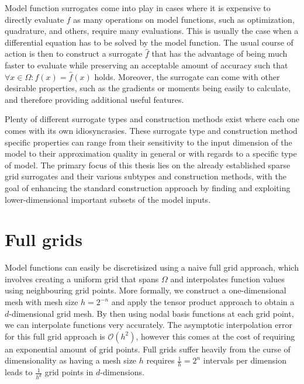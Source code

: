 \documentclass[
  a4paper,  %
  twoside,  %
  bibliography=totoc,
  headsepline,
  cleardoublepage=empty,
  parskip=half,
  draft=false
]{scrbook}
\begin{document}
Model function surrogates come into play in cases where it is expensive to directly evaluate $f$ as many operations on model functions, such as optimization, quadrature, and others, require many evaluations.
This is usually the case when a differential equation has to be solved by the model function.
The usual course of action is then to construct a surrogate $\hat{f}$ that has the advantage of being much faster to evaluate while preserving an acceptable amount of accuracy such that $\forall x \in \Omega \colon f(x)=\hat{f}(x)$ holds.
Moreover, the surrogate can come with other desirable properties, such as the gradients or moments being easily to calculate, and therefore providing additional useful features.

Plenty of different surrogate types and construction methods exist where each one comes with its own idiosyncrasies.
These surrogate type and construction method specific properties can range from their sensitivity to the input dimension of the model to their approximation quality in general or with regards to a specific type of model. 
The primary focus of this thesis lies on the already established sparse grid surrogates \cite{} and their various subtypes and construction methods, with the goal of enhancing the standard construction approach by finding and exploiting lower-dimensional important subsets of the model inputs.

\section{Full grids}

Model functions can easily be discretisized using a naive full grid approach, which involves creating a uniform grid that spans $\Omega$ and interpolates function values using neighbouring grid points.
More formally, we construct a one-dimensional mesh with mesh size $h=2^{-n}$ and apply the tensor product approach to obtain a $d$-dimensional grid mesh.
By then using nodal basis functions at each grid point, we can interpolate functions very accurately.
The asymptotic interpolation error for this full grid approach is $\mathcal{O}(h^2)$, however this comes at the cost of requiring an exponential amount of grid points.
Full grids suffer heavily from the curse of dimensionality as having a mesh size $h$ requires $\frac{1}{h}=2^n$ intervals per dimension leads to $\frac{1}{h^d}$ grid points in $d$-dimensions.
\end{document}
